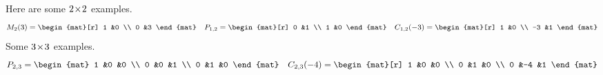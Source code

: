 \documentclass[10pt,t]{beamer}
\begin{document}
\begin{frame}
\df[df:ElementaryReductionMatrices]
\pause
\ex
Here are some $2 \! \times \! 2$ examples.
\begin{equation*}
  M_{2}(3)=
  \begin{mat}[r]
    1  &0 \\
    0  &3
  \end{mat}
  \quad
  P_{1,2}=
  \begin{mat}[r]
    0  &1 \\
    1  &0
  \end{mat}
  \quad
  C_{1,2}(-3)=
  \begin{mat}[r]
    1  &0 \\
    -3 &1
  \end{mat}
\end{equation*}
\pause
\ex
Some $3 \! \times \! 3$ examples.
\begin{equation*}
  P_{2,3}=
  \begin{mat}
    1 &0 &0 \\
    0 &0 &1 \\
    0 &1 &0
  \end{mat}
  \quad
  C_{2,3}(-4)=
  \begin{mat}[r]
    1 &0  &0 \\
    0 &1  &0 \\
    0 &-4 &1
  \end{mat}
\end{equation*}
\end{frame}
\end{document}
